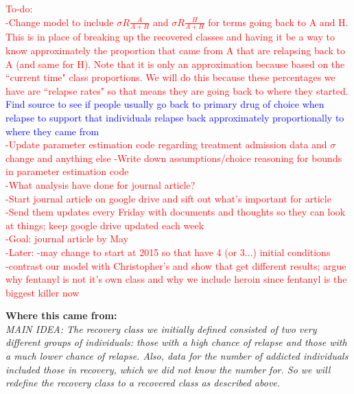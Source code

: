 \documentclass[12pt]{article}
\begin{document}
\textcolor{red}{To-do: \\
-Change model to include $\sigma R \frac{A}{A+H}$ and $\sigma R \frac{H}{A+H}$ for terms going back to A and H. This is in place of breaking up the recovered classes and having it be a way to know approximately the proportion that came from A that are relapsing back to A (and same for H). Note that it is only an approximation because based on the ``current time" class proportions. We will do this because these percentages we have are ``relapse rates" so that means they are going back to where they started. \textcolor{blue}{Find source to see if people usually go back to primary drug of choice when relapse to support that individuals relapse back approximately proportionally to where they came from}\\ 
-Update parameter estimation code regarding treatment admission data and $\sigma$ change and anything else
-Write down assumptions/choice reasoning for bounds in parameter estimation code \\ 
-What analysis have done for journal article? \\
-Start journal article on google drive and sift out what's important for article \\
-Send them updates every Friday with documents and thoughts so they can look at things; keep google drive updated each week \\
-Goal: journal article by May \\
-Later: -may change to start at 2015 so that have 4 (or 3...) initial conditions \\
-contrast our model with Christopher's and show that get different results; argue why fentanyl is not it's own class and why we include heroin since fentanyl is the biggest killer now}

\textbf{Where this came from:} \\

\textit{MAIN IDEA: The recovery class we initially defined consisted of two very different groups of individuals: those with a high chance of relapse and those with a much lower chance of relapse. Also, data for the number of addicted individuals included those in recovery, which we did not know the number for. So we will redefine the recovery class to a recovered class as described above.} \\
\end{document}

